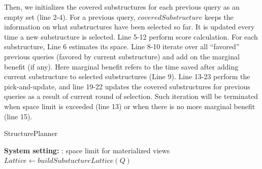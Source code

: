 Then, we initializes the covered substructures for each previous query as an empty set (line 2-4). For a previous query, $coveredSubstructure$ keeps the information on what substructures have been selected so far. %
It is updated every time a new substructure is selected. Line 5-12 perform score calculation. For each substructure, Line 6 estimates its space. Line 8-10 iterate over all ``favored'' previous queries (favored by current substructure) and add on the marginal benefit (if any). Here marginal benefit refers to the time saved after adding current substructure to selected substructures (Line 9). Line 13-23 perform the pick-and-update, and line 19-22 updates the covered substructures for previous queries as a result of current round of selection. Such iteration will be terminated when space limit is exceeded (line 13) or when there is no more marginal benefit (line 15). 

\begin{algorithm}%
\label{alg:StructurePlanner}
\caption{StructurePlanner}
\LinesNumbered 
\textbf{System setting:} \sigma: space limit for materialized views\\ 
$Lattice \leftarrow buildSubstuctureLattice(Q)$\;
\end{algorithm}

